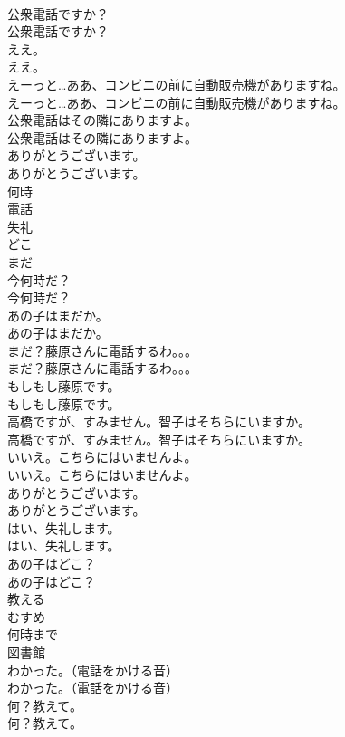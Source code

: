 \documentclass[8pt]{extreport}
\begin{document}
\begin{CJK}{UTF8}{min}
\\	公衆電話ですか？	
\\	公衆電話ですか？ 
\\	ええ。	
\\	ええ。 
\\	えーっと…ああ、コンビニの前に自動販売機がありますね。	
\\	えーっと…ああ、コンビニの前に自動販売機がありますね。 
\\	公衆電話はその隣にありますよ。	
\\	公衆電話はその隣にありますよ。 
\\	ありがとうございます。	
\\	ありがとうございます。 
\\	何時
\\	電話
\\	失礼
\\	どこ
\\	まだ
\\	今何時だ？	
\\	今何時だ？ 
\\	あの子はまだか。	
\\	あの子はまだか。 
\\	まだ？藤原さんに電話するわ。。。	
\\	まだ？藤原さんに電話するわ。。。 
\\	もしもし藤原です。	
\\	もしもし藤原です。 
\\	高橋ですが、すみません。智子はそちらにいますか。	
\\	高橋ですが、すみません。智子はそちらにいますか。 
\\	いいえ。こちらにはいませんよ。	
\\	いいえ。こちらにはいませんよ。 
\\	ありがとうございます。	
\\	ありがとうございます。 
\\	はい、失礼します。	
\\	はい、失礼します。 
\\	あの子はどこ？	
\\	あの子はどこ？ 
\\	教える
\\	むすめ
\\	何時まで
\\	図書館
\\	わかった。（電話をかける音）	
\\	わかった。（電話をかける音） 
\\	何？教えて。	
\\	何？教えて。 

\end{CJK}
\end{document}
